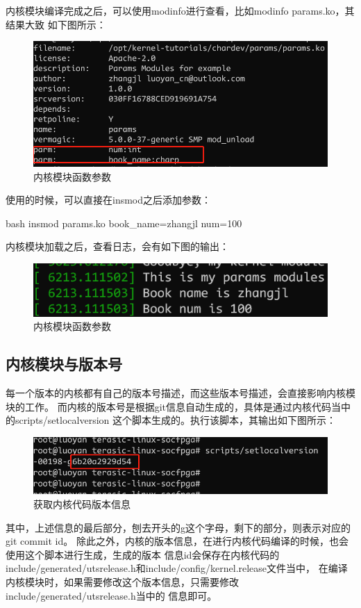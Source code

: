 内核模块编译完成之后，可以使用modinfo进行查看，比如modinfo params.ko，其结果大致
如下图所示：
\begin{figure}[H]
  \centering
  \includegraphics[width=\linewidth]{params.png}
  \caption{内核模块函数参数}
  \label{fig:params}
\end{figure}

使用的时候，可以直接在insmod之后添加参数：
\begin{code-block}{bash}
insmod params.ko book_name=zhangjl num=100
\end{code-block}
内核模块加载之后，查看日志，会有如下图的输出：
\begin{figure}[H]
  \centering
  \includegraphics[width=\linewidth]{params_out.png}
  \caption{内核模块函数参数}
  \label{fig:params_out}
\end{figure}

\subsection{内核模块与版本号}
每一个版本的内核都有自己的版本号描述，而这些版本号描述，会直接影响内核模块的工作。
而内核的版本号是根据git信息自动生成的，具体是通过内核代码当中的scripts/setlocalversion
这个脚本生成的。执行该脚本，其输出如下图所示：
\begin{figure}[H]
  \centering
  \includegraphics[width=\linewidth]{version.png}
  \caption{获取内核代码版本信息}
  \label{fig:version}
\end{figure}
其中，上述信息的最后部分，刨去开头的g这个字母，剩下的部分，则表示对应的git commit id。
除此之外，内核的版本信息，在进行内核代码编译的时候，也会使用这个脚本进行生成，生成的版本
信息id会保存在内核代码的include/generated/utsrelease.h和include/config/kernel.release文件当中，
在编译内核模块时，如果需要修改这个版本信息，只需要修改include/generated/utsrelease.h当中的
信息即可。

